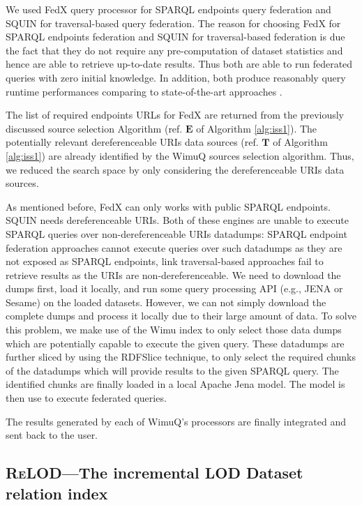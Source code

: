 \documentclass[sw]{iosart2x}
\begin{document}
We used FedX \cite{fedx2011} query processor for SPARQL endpoints query federation and SQUIN for traversal-based query federation. The reason for choosing FedX for SPARQL endpoints federation and SQUIN for traversal-based federation is due the fact that they do not require any pre-computation of dataset statistics and hence are able to retrieve up-to-date results. Thus both are able to run federated queries with zero initial knowledge. In addition, both produce reasonably query runtime performances comparing to state-of-the-art approaches \cite{saleem2015fine,saleem2018costfed,hartig2013squin}.

The list of required endpoints URLs for FedX are returned from the previously discussed source selection Algorithm (ref. $\mathbf{E}$ of Algorithm \ref{alg:iss1}). The potentially relevant dereferenceable URIs data sources (ref. $\mathbf{T}$ of Algorithm \ref{alg:iss1}) are already identified by the WimuQ sources selection algorithm. Thus, we reduced the search space by only considering the dereferenceable URIs data sources. 
 
As mentioned before, FedX can only works with public SPARQL endpoints. SQUIN needs dereferenceable URIs. Both of these engines are unable to execute SPARQL queries over non-dereferenceable URIs datadumps: SPARQL endpoint federation approaches cannot execute queries over such datadumps as they are not exposed as SPARQL endpoints, link traversal-based approaches fail to retrieve results as the URIs are non-dereferenceable. We need to download the dumps first, load it locally, and run some query processing API (e.g., JENA or Sesame) on the loaded datasets. However, we can not simply download the complete dumps and process it locally due to their large amount of data. To solve this problem, we make use of the Wimu index to only select those data dumps which are potentially capable to execute the given query. These datadumps are further sliced by using the RDFSlice technique, to only select the required chunks of the datadumps which will provide results to the given SPARQL query. The identified chunks are finally loaded in a local Apache Jena model. The model is then use to execute federated queries. 

The results generated by each of WimuQ's processors are finally integrated and sent back to the user. 

\subsection{\textsc{ReLOD}---The incremental LOD Dataset relation index} \label{sec:relod}
\end{document}
